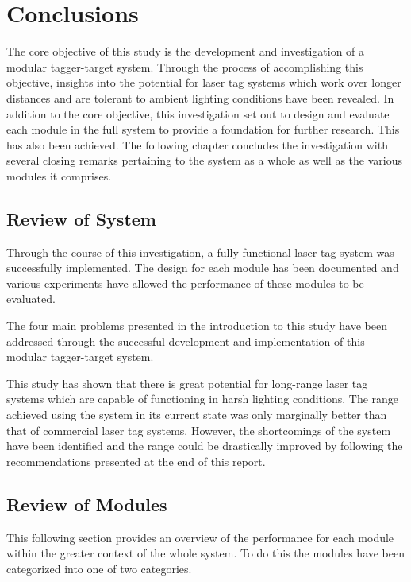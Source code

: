 \chapter{Conclusions}
\label{ch_conclusions}



The core objective of this study is the development and investigation of a modular tagger-target system. Through the process of accomplishing this objective, insights into the potential for laser tag systems which work over longer distances and are tolerant to ambient lighting conditions have been revealed.
In addition to the core objective, this investigation set out to design and evaluate each module in the full system to provide a foundation for further research. This has also been achieved. The following chapter concludes the investigation with several closing remarks pertaining to the system as a whole as well as the various modules it comprises.

\section{Review of System}

Through the course of this investigation, a fully functional laser tag system was successfully implemented. The design for each module has been documented and various experiments have allowed the performance of these modules to be evaluated.

The four main problems presented in the introduction to this study have been addressed through the successful development and implementation of this modular tagger-target system. 

This study has shown that there is great potential for long-range laser tag systems which are capable of functioning in harsh lighting conditions. The range achieved using the system in its current state was only marginally better than that of commercial laser tag systems. However, the shortcomings of the system have been identified and the range could be drastically improved by following the recommendations presented at the end of this report.

\section{Review of Modules}
This following section provides an overview of the performance for each module within the greater context of the whole system. To do this the modules have been categorized into one of two categories.

